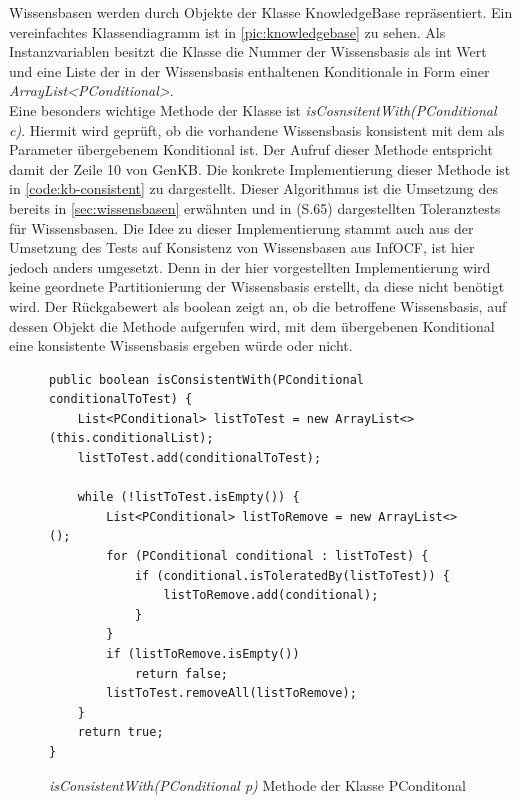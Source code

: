 \documentclass[12pt,a4paper]{article}
\begin{document}
Wissensbasen werden durch Objekte der Klasse KnowledgeBase repräsentiert. Ein vereinfachtes Klassendiagramm ist in \autoref{pic:knowledgebase} zu sehen. Als Instanzvariablen besitzt die Klasse die Nummer der Wissensbasis als int Wert und eine Liste der in der Wissensbasis enthaltenen Konditionale in Form einer \textit{ArrayList<PConditional>}.\\
Eine besonders wichtige Methode der Klasse ist \textit{isCosnsitentWith(PConditional c)}. Hiermit wird geprüft, ob die vorhandene Wissensbasis konsistent mit dem als Parameter übergebenem Konditional ist. Der Aufruf dieser Methode entspricht damit der Zeile 10 von GenKB. Die konkrete Implementierung dieser Methode ist in \autoref{code:kb-consistent} zu dargestellt. Dieser Algorithmus ist die Umsetzung des bereits in \autoref{sec:wissensbasen} erwähnten und in \cite{goldszmidt96}(S.65) dargestellten Toleranztests für Wissensbasen.  Die Idee zu dieser Implementierung stammt auch aus der Umsetzung des Tests auf Konsistenz von Wissensbasen aus InfOCF, ist hier jedoch anders umgesetzt. Denn in der hier vorgestellten Implementierung wird keine geordnete Partitionierung der Wissensbasis erstellt, da diese nicht benötigt wird. Der Rückgabewert als boolean zeigt an, ob die betroffene Wissensbasis, auf dessen Objekt die Methode aufgerufen wird, mit dem übergebenen Konditional eine konsistente Wissensbasis ergeben würde oder nicht.


\begin{figure}
\begin{lstlisting}
public boolean isConsistentWith(PConditional conditionalToTest) {
    List<PConditional> listToTest = new ArrayList<>(this.conditionalList);
    listToTest.add(conditionalToTest);

    while (!listToTest.isEmpty()) {
        List<PConditional> listToRemove = new ArrayList<>();
        for (PConditional conditional : listToTest) {
            if (conditional.isToleratedBy(listToTest)) {
                listToRemove.add(conditional);
            }
        }
        if (listToRemove.isEmpty())
            return false;
        listToTest.removeAll(listToRemove);
    }
    return true;
}
\end{lstlisting}
\caption{\textit{isConsistentWith(PConditional p)} Methode der Klasse PConditonal}
\label{code:kb-consistent}
\end{figure} 
\end{document}

